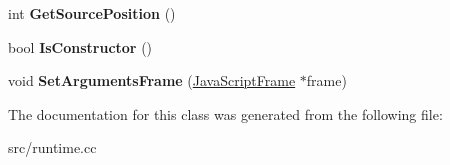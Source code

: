 \begin{DoxyCompactItemize}
\item 
\hypertarget{classv8_1_1internal_1_1_frame_inspector_a31b51923ecbf8f24b7bb7090b6655271}{}int {\bfseries Get\+Source\+Position} ()\label{classv8_1_1internal_1_1_frame_inspector_a31b51923ecbf8f24b7bb7090b6655271}

\item 
\hypertarget{classv8_1_1internal_1_1_frame_inspector_a7e4ed371c98867c2c81e7f567f216a7f}{}bool {\bfseries Is\+Constructor} ()\label{classv8_1_1internal_1_1_frame_inspector_a7e4ed371c98867c2c81e7f567f216a7f}

\item 
\hypertarget{classv8_1_1internal_1_1_frame_inspector_a154b259576f39ff2257386bb63231c9b}{}void {\bfseries Set\+Arguments\+Frame} (\hyperlink{classv8_1_1internal_1_1_java_script_frame}{Java\+Script\+Frame} $\ast$frame)\label{classv8_1_1internal_1_1_frame_inspector_a154b259576f39ff2257386bb63231c9b}

\end{DoxyCompactItemize}


The documentation for this class was generated from the following file\+:\begin{DoxyCompactItemize}
\item 
src/runtime.\+cc\end{DoxyCompactItemize}
